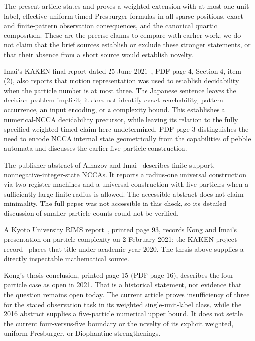 \documentclass[11pt,letterpaper]{article}
\numberwithin{equation}{section}
\theoremstyle{definition}
\theoremstyle{remark}
\begin{document}
The present article states and proves a weighted extension with at most one
unit label, effective uniform timed Presburger formulas in all sparse positions,
exact and finite-pattern observation consequences, and the canonical quartic
composition. These are the precise claims to compare with earlier work;
we do not claim that the brief sources establish or exclude these stronger
statements, or that their absence from a short source would establish novelty.

Imai's KAKEN final report dated 25 June 2021~\cite{kakenfinal}, PDF page 4,
Section 4, item (2), also reports that motion representation was used to establish
decidability when the particle number is at most three. The Japanese sentence
leaves the decision problem implicit; it does not identify exact reachability,
pattern occurrence, an input encoding, or a complexity bound. This establishes a
numerical-NCCA decidability precursor, while leaving its relation to the fully
specified weighted timed claim here undetermined. PDF page 3 distinguishes the need to
encode NCCA internal state geometrically from the capabilities of pebble
automata and discusses the earlier five-particle construction.

The publisher abstract of Alhazov and Imai~\cite{alhazovimai} describes
finite-support, nonnegative-integer-state NCCAs. It reports a radius-one
universal construction via two-register machines and a universal construction
with five particles when a sufficiently large finite radius is allowed.
The accessible abstract does not claim minimality. The full paper was not
accessible in this check, so its detailed discussion of smaller particle counts
could not be verified.

A Kyoto University RIMS report~\cite{kongprogram}, printed page 93, records
Kong and Imai's presentation on particle complexity on 2 February 2021;
the KAKEN project record~\cite{kaken} places that title under academic year 2020.
The thesis above supplies a directly inspectable mathematical source.

Kong's thesis conclusion, printed page 15 (PDF page 16), describes the
four-particle case as open in 2021. That is a historical statement, not evidence
that the question remains open today. The current article proves insufficiency
of three for the stated observation task in its weighted single-unit-label
class, while the 2016 abstract supplies a five-particle numerical upper bound.
It does not settle the current four-versus-five boundary or the novelty of its
explicit weighted, uniform Presburger, or Diophantine strengthenings.
\end{document}
